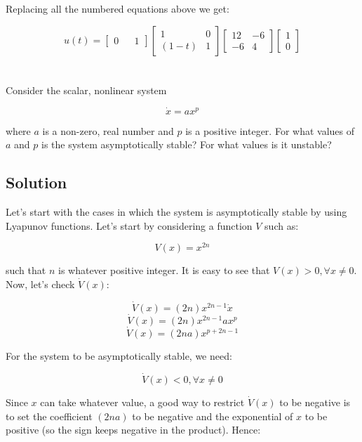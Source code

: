 \documentclass[10pt,a4paper]{article}
\begin{document}
Replacing all the numbered equations above we get:

\[ u(t) = 
\begin{bmatrix} 0 && 1 \end{bmatrix}
\begin{bmatrix} 1 & 0 \\ (1 - t) & 1 \end{bmatrix} 
\begin{bmatrix} 
12 & -6 \\ 
-6 & 4
\end{bmatrix} 
\begin{bmatrix} 1 \\ 0 \end{bmatrix} \]

\begin{center}
\end{center}

\section{}
Consider the scalar, nonlinear system

\[ \dot{x} = ax^{p} \]

where $a$ is a non-zero, real number and $p$ is a positive integer. For what values of $a$ and $p$ is the system  asymptotically stable? For what values is it unstable?

\subsection*{Solution}
Let's start with the cases in which the system is asymptotically stable by using Lyapunov functions. Let's start by considering a function $V$ such as:

\[ V(x) = x^{2n} \]

such that $n$ is whatever positive integer. It is easy to see that $V(x) > 0, \forall x \neq 0 $. Now, let's check $\dot{V}(x)$:

\[ \dot{V}(x) = (2n)x^{2n-1}\dot{x} \]
\[ \dot{V}(x) = (2n)x^{2n-1}ax^{p} \]
\[ \dot{V}(x) = (2na)x^{p + 2n-1} \]

For the system to be asymptotically stable, we need:

\[ \dot{V}(x) < 0, \forall x \neq 0 \]

Since $x$ can take whatever value, a good way to restrict $\dot{V}(x)$ to be negative is to set the coefficient $(2na)$ to be negative and the exponential of $x$ to be positive (so the sign keeps negative in the product).  Hence:
\end{document}
